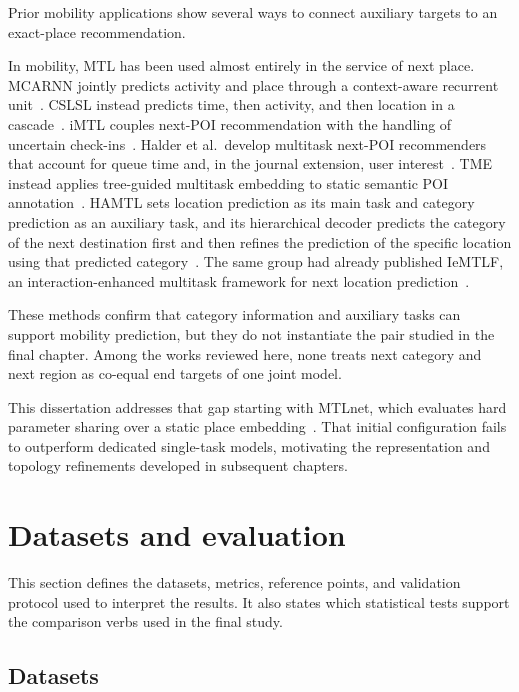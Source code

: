 Prior mobility applications show several ways to connect auxiliary targets to an
exact-place recommendation.

In mobility, MTL has been used almost entirely in the service of next place. MCARNN jointly
predicts activity and place through a context-aware recurrent
unit~\cite{Liao2018}. CSLSL instead predicts time, then activity, and then location in
a cascade~\cite{huang2024cslsl}. iMTL couples next-POI recommendation with the
handling of uncertain check-ins~\cite{Zhang2020}. Halder et al.\ develop multitask
next-POI recommenders that account for queue time and, in the journal extension, user
interest~\cite{Halder2021,Halder2022}. TME instead applies tree-guided multitask
embedding to static semantic POI annotation~\cite{Xu2023}. HAMTL sets location
prediction as its main task and category prediction as an auxiliary task, and its
hierarchical decoder predicts the category of the next destination first and then
refines the prediction of the specific location using that predicted
category~\cite{wang2025hamtl}. The same group had already published IeMTLF, an
interaction-enhanced multitask framework for next location
prediction~\cite{wang2024iemtlf}.

These methods confirm that category information and auxiliary tasks can support
mobility prediction, but they do not instantiate the pair studied in the final
chapter. Among the works reviewed here, none treats next category and next region as
co-equal end targets of one joint model.

This dissertation addresses that gap starting with MTLnet, which evaluates hard
parameter sharing over a static place embedding~\cite{silva2025mtlnet}. That initial
configuration fails to outperform dedicated single-task models, motivating the
representation and topology refinements developed in subsequent chapters.


\section{Datasets and evaluation}
\label{sec:fund:eval}

This section defines the datasets, metrics, reference points, and validation protocol
used to interpret the results. It also states which statistical tests support the
comparison verbs used in the final study.

\subsection{Datasets}

